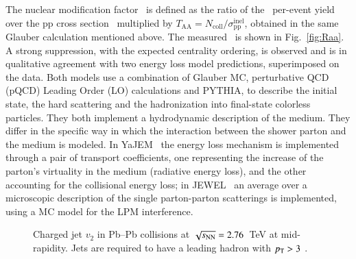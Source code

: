\documentclass[3p,times]{simplearticle}
\begin{document}
The nuclear modification factor \RAA\ is defined as the ratio of the \PbPb\ per-event yield over the pp cross section~\cite{ALICE:2013c} 
multiplied by $T_{\mathrm{AA}}=N_{\mathrm{coll}} / \sigma^{\mathrm{inel}}_{\mathrm{pp}}$, obtained in the same
Glauber calculation mentioned above. The measured \RAA\ is shown in Fig.~\ref{fig:Raa}. A strong suppression, with the expected centrality
ordering, is observed and is in qualitative agreement with two 
energy loss model predictions, superimposed on the data. 
Both models use a combination of Glauber MC, perturbative QCD (pQCD) Leading Order (LO) calculations and PYTHIA,
to describe the initial state, the hard scattering and the hadronization into final-state colorless particles. 
They both implement a hydrodynamic description of the medium.
They differ in the specific way in which the interaction between the shower parton and the medium is modeled.
In YaJEM~\cite{Renk:2013} the energy loss mechanism is implemented through a pair of transport coefficients, 
one representing the increase of the parton's virtuality in the medium (radiative energy loss), and 
the other accounting for the collisional energy loss; in JEWEL~\cite{Zapp:2014} an average over a microscopic description
of the single parton-parton scatterings is implemented, using a MC model for the LPM interference.
%
\begin{figure}[t]
\centering
{} \quad
{} 
\caption{Charged jet $v_2$ in \mbox{Pb--Pb} collisions at $\sqrt{s_{\mathrm{NN}}}=2.76$~TeV at mid-rapidity. Jets are required to have a leading
hadron with $p_{\mathrm{T}}>3$ \GeVc.}
\label{fig:Jetv2}
\end{figure}
%
\end{document}
